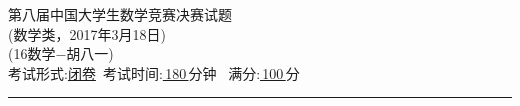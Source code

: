 \documentclass[UTF8]{ctexart}
\begin{document}
	\begin{center}
		{\xingkai 第八届中国大学生数学竞赛决赛试题}\\[1.5mm]
		{ (数学类，2017年3月18日)}\\[2mm]
		 (16数学$-$胡八一)\\[3mm]
		{考试形式:\underline{\;闭卷\;}\quad\, 考试时间:\underline{\;\;\,180\;\;\,}分钟   \quad\, 满分:\underline{\;\;\,100\;\;\,}分}
	\end{center}
	\vspace*{-7mm}\rule{\textwidth}{0.1pt}%
	\newcommand{\blank}{\underline{\hspace{2cm}}}
	\setlength{\topsep}{1ex}%
	\setlength{\itemsep}{-2mm}%
\end{document}
